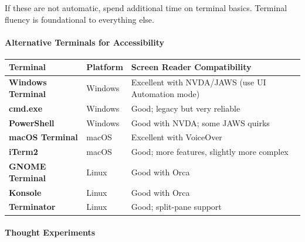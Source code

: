 \documentclass[
  justified,
  openright,
]{tufte-book}
\let\paragraph\paragraph
\let\paragraph\paragraph
\begin{document}
If these are not automatic, spend additional time on terminal basics.
Terminal fluency is foundational to everything else.

\paragraph{Alternative Terminals for
Accessibility}\label{alternative-terminals-for-accessibility}

\begin{fullwidth}{\def\LTcaptype{none} %
\begin{longtable}[]{@{}
  >{\raggedright\arraybackslash}p{}
  >{\raggedright\arraybackslash}p{}
  >{\raggedright\arraybackslash}p{}@{}}
\toprule\noalign{}
\begin{minipage}[b]{\linewidth}\raggedright
Terminal
\end{minipage} & \begin{minipage}[b]{\linewidth}\raggedright
Platform
\end{minipage} & \begin{minipage}[b]{\linewidth}\raggedright
Screen Reader Compatibility
\end{minipage} \\
\midrule\noalign{}
\endhead
\bottomrule\noalign{}
\endlastfoot
\textbf{Windows Terminal} & Windows & Excellent with NVDA/JAWS (use UI
Automation mode) \\
\textbf{cmd.exe} & Windows & Good; legacy but very reliable \\
\textbf{PowerShell} & Windows & Good with NVDA; some JAWS quirks \\
\textbf{macOS Terminal} & macOS & Excellent with VoiceOver \\
\textbf{iTerm2} & macOS & Good; more features, slightly more complex \\
\textbf{GNOME Terminal} & Linux & Good with Orca \\
\textbf{Konsole} & Linux & Good with Orca \\
\textbf{Terminator} & Linux & Good; split-pane support \\
\end{longtable}
}\end{fullwidth}

\paragraph{Thought Experiments}\label{thought-experiments-3}
\end{document}
